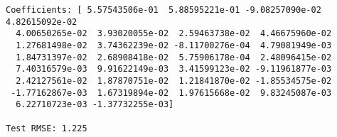 \begin{codebox}[breakable, size=fbox, boxrule=1pt, pad at break*=1mm,colback=cellbackground, colframe=cellborder]
\begin{Verbatim}[commandchars=\\\{\}]
Coefficients: [ 5.57543506e-01  5.88595221e-01 -9.08257090e-02  4.82615092e-02
  4.00650265e-02  3.93020055e-02  2.59463738e-02  4.46675960e-02
  1.27681498e-02  3.74362239e-02 -8.11700276e-04  4.79081949e-03
  1.84731397e-02  2.68908418e-02  5.75906178e-04  2.48096415e-02
  7.40316579e-03  9.91622149e-03  3.41599123e-02 -9.11961877e-03
  2.42127561e-02  1.87870751e-02  1.21841870e-02 -1.85534575e-02
 -1.77162867e-03  1.67319894e-02  1.97615668e-02  9.83245087e-03
  6.22710723e-03 -1.37732255e-03]

Test RMSE: 1.225
\end{Verbatim}
\end{codebox}

\begin{center}
\end{center}
    
%
%
%
%
%
%
%

